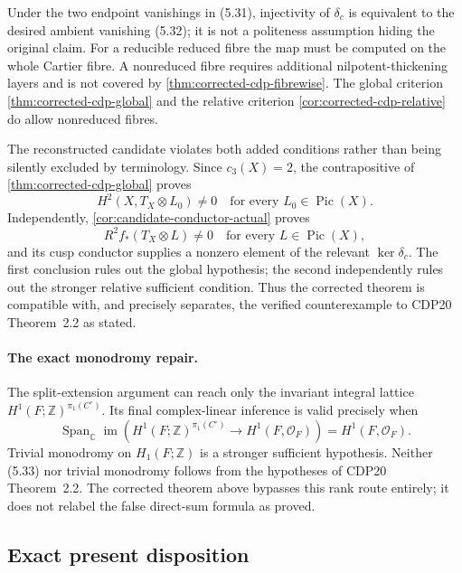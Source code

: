 \begin{remark}
Under the two endpoint vanishings in (5.31), injectivity of \(\delta_c\) is
equivalent to the desired ambient vanishing (5.32); it is not a politeness
assumption hiding the original claim.  For a reducible reduced fibre the
map must be computed on the whole Cartier fibre.  A nonreduced fibre requires
additional nilpotent-thickening layers and is not covered by
\cref{thm:corrected-cdp-fibrewise}.  The global criterion
\cref{thm:corrected-cdp-global} and the relative criterion
\cref{cor:corrected-cdp-relative} do allow nonreduced fibres.

The reconstructed candidate violates both added conditions rather than being
silently excluded by terminology.  Since \(c_3(X)=2\), the contrapositive of
\cref{thm:corrected-cdp-global} proves
\[
 H^2(X,T_X\otimes L_0)\ne0
 \quad\text{for every }L_0\in\operatorname{Pic}(X).
\]
Independently, \cref{cor:candidate-conductor-actual} proves
\[
 R^2f_*(T_X\otimes L)\ne0
 \quad\text{for every }L\in\operatorname{Pic}(X),
\]
and its cusp conductor supplies a nonzero element of the relevant
\(\ker\delta_c\).  The first conclusion rules out the global hypothesis; the
second independently rules out the stronger relative sufficient condition.
Thus the corrected theorem is compatible with, and
precisely separates, the verified counterexample to CDP20
Theorem~2.2 as stated.
\end{remark}

\paragraph{The exact monodromy repair.}
The split-extension argument can reach only the invariant integral lattice
\(H^1(F;\mathbb Z)^{\pi_1(C^\circ)}\).  Its final complex-linear inference is
valid precisely when
\[
 \operatorname{Span}_{\mathbb C}\operatorname{im}\!\left(
 H^1(F;\mathbb Z)^{\pi_1(C^\circ)}
 \longrightarrow H^1(F,\mathcal O_F)\right)
 =H^1(F,\mathcal O_F).
\tag{5.33}
\]
Trivial monodromy on \(H_1(F;\mathbb Z)\) is a stronger sufficient
hypothesis.  Neither (5.33) nor trivial monodromy follows from the hypotheses
of CDP20 Theorem~2.2.  The corrected theorem above bypasses this rank route
entirely; it does not relabel the false direct-sum formula as proved.

\subsection{Exact present disposition}

